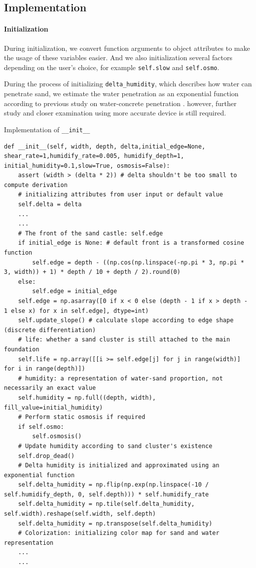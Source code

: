 \documentclass[12pt]{article}
\begin{document}
\subsection{Implementation}
\paragraph{Initialization}
During initialization, we convert function arguments to object attributes to make the usage of these variables easier. And we also initialization several factors depending on the user's choice, for example \texttt{self.slow} and \texttt{self.osmo}.
\par
During the process of initializing \texttt{delta\_humidity}, which describes how water can penetrate sand, we estimate the water penetration as an exponential function according to previous study on water-concrete penetration \autocite{yoo2011analytical}. however, further study and closer examination using more accurate device is still required.

\begin{longlisting}
    \caption{Implementation of \texttt{\_\_init\_\_}}
    \begin{verbatim}
def __init__(self, width, depth, delta,initial_edge=None, shear_rate=1,humidify_rate=0.005, humidify_depth=1, initial_humidity=0.1,slow=True, osmosis=False):
    assert (width > (delta * 2)) # delta shouldn't be too small to compute derivation
    # initializing attributes from user input or default value
    self.delta = delta
    ...
    ...
    # The front of the sand castle: self.edge
    if initial_edge is None: # default front is a transformed cosine function
        self.edge = depth - ((np.cos(np.linspace(-np.pi * 3, np.pi * 3, width)) + 1) * depth / 10 + depth / 2).round(0)
    else:
        self.edge = initial_edge
    self.edge = np.asarray([0 if x < 0 else (depth - 1 if x > depth - 1 else x) for x in self.edge], dtype=int)
    self.update_slope() # calculate slope according to edge shape (discrete differentiation)  
    # life: whether a sand cluster is still attached to the main foundation
    self.life = np.array([[i >= self.edge[j] for j in range(width)] for i in range(depth)])
    # humidity: a representation of water-sand proportion, not necessarily an exact value
    self.humidity = np.full((depth, width), fill_value=initial_humidity)
    # Perform static osmosis if required
    if self.osmo:
        self.osmosis()
    # Update humidity according to sand cluster's existence
    self.drop_dead()
    # Delta humidity is initialized and approximated using an exponential function
    self.delta_humidity = np.flip(np.exp(np.linspace(-10 / self.humidify_depth, 0, self.depth))) * self.humidify_rate
    self.delta_humidity = np.tile(self.delta_humidity, self.width).reshape(self.width, self.depth)
    self.delta_humidity = np.transpose(self.delta_humidity)
    # Colorization: initializing color map for sand and water representation
    ...
    ...
    \end{verbatim}
\end{longlisting}
\end{document}
